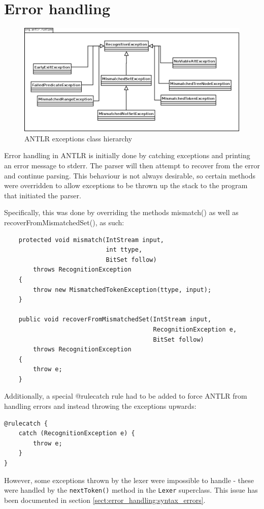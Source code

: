 \section{Error handling}
\label{sec:impl:errorhandling}
\begin{figure}[!h]
  \centering
    \includegraphics[width=1\textwidth]{img/exception_uml.png}
  \caption{ANTLR exceptions class hierarchy}
\end{figure}
Error handling in ANTLR is initially done by catching exceptions and printing
an error message to stderr. The parser will then attempt to recover from the
error and continue parsing. This behaviour is not always desirable, so certain
methods were overridden to allow exceptions to be thrown up the stack to the
program that initiated the parser.

Specifically, this was done by overriding the methods mismatch() as well as
recoverFromMismatchedSet(), as such:

\begin{verbatim}
    protected void mismatch(IntStream input, 
                            int ttype, 
                            BitSet follow)
        throws RecognitionException
    {
        throw new MismatchedTokenException(ttype, input);
    }

    public void recoverFromMismatchedSet(IntStream input, 
                                         RecognitionException e, 
                                         BitSet follow)
        throws RecognitionException
    {
        throw e;
    }
\end{verbatim}

Additionally, a special @rulecatch rule had to be added to force ANTLR from
handling errors and instead throwing the exceptions upwards:

\begin{verbatim}
@rulecatch {
    catch (RecognitionException e) {
        throw e;
    }
}
\end{verbatim}

However, some exceptions thrown by the lexer were impossible to handle - these
were handled by the \verb!nextToken()! method in the \verb!Lexer! superclass.
This issue has been documented in section
\ref{sect:error_handling:syntax_errors}.
